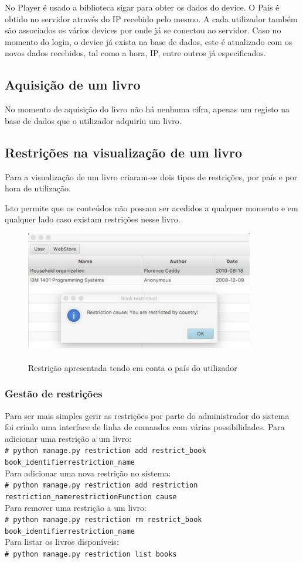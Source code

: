 \documentclass[pdftex,12pt,a4paper]{report}
\newcommand{\shellcmd}[1]{\\\indent\indent\texttt{\footnotesize\# #1}\\}
\begin{document}
	No Player é usado a biblioteca sigar para obter os dados do device. O País é obtido no servidor através do IP recebido pelo mesmo.
	A cada utilizador também são associados os vários devices por onde já se conectou ao servidor.
	Caso no momento do login, o device já exista na base de dados, este é atualizado com os novos dados recebidos, tal como a hora, IP, entre outros já especificados.

\subsection{Aquisição de um livro}

No momento de aquisição do livro não há nenhuma cifra, apenas um registo na base de dados que o utilizador adquiriu um livro.

\subsection{Restrições na visualização de um livro}

Para a visualização de um livro criaram-se dois tipos de restrições, por país e por hora de utilização.

Isto permite que os conteúdos não possam ser acedidos a qualquer momento e em qualquer lado caso existam restrições nesse livro.

\begin{figure}[!htb]
\center
 \includegraphics[width=100mm,scale=1]{country_restriction.pdf}
 \caption{\\Restrição apresentada tendo em conta o país do utilizador}
 \label{fig:eer}
\end{figure}

\subsubsection{Gestão de restrições}

Para ser mais simples gerir as restrições por parte do administrador do sistema foi criado uma interface de linha de comandos com várias possibilidades. 
Para adicionar uma restrição a um livro:
\shellcmd{python manage.py restriction add restrict{\_}book book{\_}identifier\linebreak restriction{\_}name}
Para adicionar uma nova restrição no sistema:
\shellcmd{python manage.py restriction add restriction restriction{\_}name\linebreak restrictionFunction cause}
Para remover uma restrição a um livro:
\shellcmd{python manage.py restriction rm restrict{\_}book book{\_}identifier\linebreak restriction{\_}name}
Para listar os livros disponíveis:
\shellcmd{python manage.py restriction list books}
\end{document}
